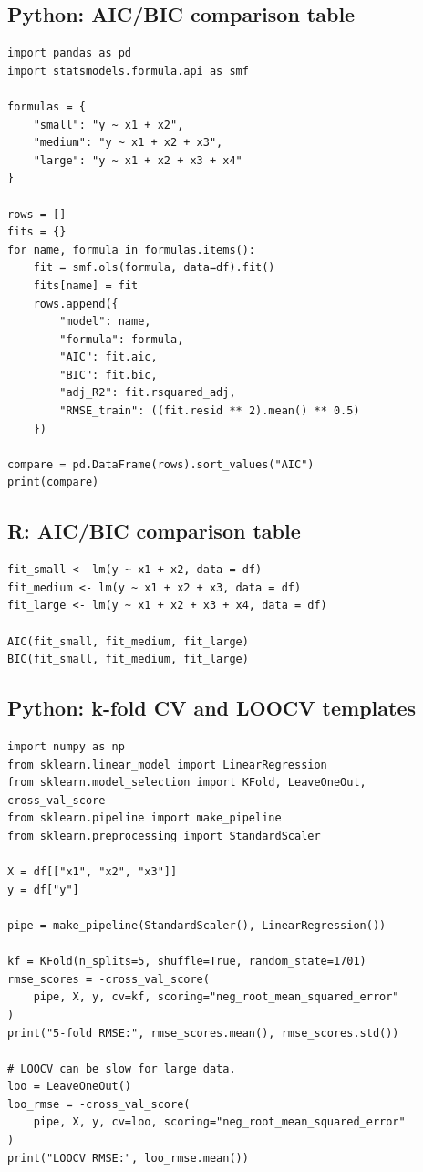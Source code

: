 \subsection*{Python: AIC/BIC comparison table}

\begin{verbatim}
import pandas as pd
import statsmodels.formula.api as smf

formulas = {
    "small": "y ~ x1 + x2",
    "medium": "y ~ x1 + x2 + x3",
    "large": "y ~ x1 + x2 + x3 + x4"
}

rows = []
fits = {}
for name, formula in formulas.items():
    fit = smf.ols(formula, data=df).fit()
    fits[name] = fit
    rows.append({
        "model": name,
        "formula": formula,
        "AIC": fit.aic,
        "BIC": fit.bic,
        "adj_R2": fit.rsquared_adj,
        "RMSE_train": ((fit.resid ** 2).mean() ** 0.5)
    })

compare = pd.DataFrame(rows).sort_values("AIC")
print(compare)
\end{verbatim}

\subsection*{R: AIC/BIC comparison table}

\begin{verbatim}
fit_small <- lm(y ~ x1 + x2, data = df)
fit_medium <- lm(y ~ x1 + x2 + x3, data = df)
fit_large <- lm(y ~ x1 + x2 + x3 + x4, data = df)

AIC(fit_small, fit_medium, fit_large)
BIC(fit_small, fit_medium, fit_large)
\end{verbatim}

\subsection*{Python: k-fold CV and LOOCV templates}

\begin{verbatim}
import numpy as np
from sklearn.linear_model import LinearRegression
from sklearn.model_selection import KFold, LeaveOneOut, cross_val_score
from sklearn.pipeline import make_pipeline
from sklearn.preprocessing import StandardScaler

X = df[["x1", "x2", "x3"]]
y = df["y"]

pipe = make_pipeline(StandardScaler(), LinearRegression())

kf = KFold(n_splits=5, shuffle=True, random_state=1701)
rmse_scores = -cross_val_score(
    pipe, X, y, cv=kf, scoring="neg_root_mean_squared_error"
)
print("5-fold RMSE:", rmse_scores.mean(), rmse_scores.std())

# LOOCV can be slow for large data.
loo = LeaveOneOut()
loo_rmse = -cross_val_score(
    pipe, X, y, cv=loo, scoring="neg_root_mean_squared_error"
)
print("LOOCV RMSE:", loo_rmse.mean())
\end{verbatim}

